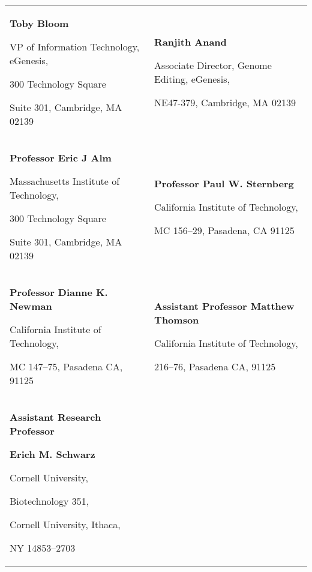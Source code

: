 \newpage
{}

\begin{tabularx}{\textwidth}{@{}X X@{}}
  \textbf{Toby Bloom}\par
    VP of Information Technology, eGenesis,\par
    300 Technology Square\par
    Suite 301, Cambridge, MA 02139\par
    \makefield{\faEnvelopeO}{\url{tbloom@alum.mit.edu}}

  &

  \textbf{Ranjith Anand}\par
    Associate Director, Genome Editing, eGenesis,\par
    NE47-379, Cambridge, MA 02139\par
    \makefield{\faEnvelopeO}{\url{rapanand@gmail.com}}\\

  \textbf{Professor Eric J Alm}\par
    Massachusetts Institute of Technology,\par
    300 Technology Square\par
    Suite 301, Cambridge, MA 02139\par
    \makefield{\faEnvelopeO}{\url{burnss@mit.edu}}

  &

  \textbf{Professor Paul W. Sternberg}\par
    California Institute of Technology,\par
    MC 156--29, Pasadena, CA 91125\par
    \makefield{\faEnvelopeO}{\url{pws@caltech.edu}}\\

  \textbf{Professor Dianne K. Newman}\par
    California Institute of Technology,\par
    MC 147--75, Pasadena CA, 91125\par
    \makefield{\faEnvelopeO}{\url{dkn@caltech.edu}}

  &

  \textbf{Assistant Professor Matthew Thomson}\par
    California Institute of Technology,\par
    216--76, Pasadena CA, 91125\par
    \makefield{\faEnvelopeO}{\url{mthomson@caltech.edu}}\\

  \textbf{Assistant Research Professor}\par
  \textbf{Erich M. Schwarz}\par
    Cornell University,\par
    Biotechnology 351,\par
    Cornell University, Ithaca,\par
    NY 14853--2703\par
    \makefield{\faEnvelopeO}{\url{ems394@cornell.edu}}
\end{tabularx}
